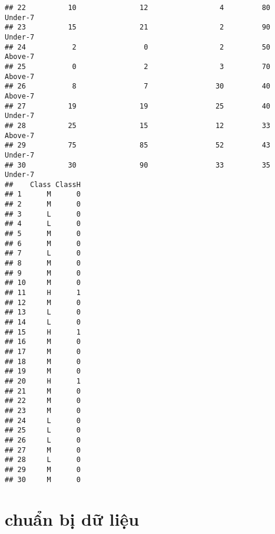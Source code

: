 \documentclass[
]{article}
\newenvironment{Shaded}{\begin{snugshade}}{\end{snugshade}}
\newcommand{\AttributeTok}[1]{\textcolor[rgb]{0.77,0.63,0.00}{#1}}
\newcommand{\CommentTok}[1]{\textcolor[rgb]{0.56,0.35,0.01}{\textit{#1}}}
\newcommand{\ConstantTok}[1]{\textcolor[rgb]{0.00,0.00,0.00}{#1}}
\newcommand{\DecValTok}[1]{\textcolor[rgb]{0.00,0.00,0.81}{#1}}
\newcommand{\FloatTok}[1]{\textcolor[rgb]{0.00,0.00,0.81}{#1}}
\newcommand{\FunctionTok}[1]{\textcolor[rgb]{0.00,0.00,0.00}{#1}}
\newcommand{\NormalTok}[1]{#1}
\newcommand{\OtherTok}[1]{\textcolor[rgb]{0.56,0.35,0.01}{#1}}
\newcommand{\SpecialCharTok}[1]{\textcolor[rgb]{0.00,0.00,0.00}{#1}}
\begin{document}
\begin{verbatim}
## 22          10               12                 4         80            Under-7
## 23          15               21                 2         90            Under-7
## 24           2                0                 2         50            Above-7
## 25           0                2                 3         70            Above-7
## 26           8                7                30         40            Above-7
## 27          19               19                25         40            Under-7
## 28          25               15                12         33            Above-7
## 29          75               85                52         43            Under-7
## 30          30               90                33         35            Under-7
##    Class ClassH
## 1      M      0
## 2      M      0
## 3      L      0
## 4      L      0
## 5      M      0
## 6      M      0
## 7      L      0
## 8      M      0
## 9      M      0
## 10     M      0
## 11     H      1
## 12     M      0
## 13     L      0
## 14     L      0
## 15     H      1
## 16     M      0
## 17     M      0
## 18     M      0
## 19     M      0
## 20     H      1
## 21     M      0
## 22     M      0
## 23     M      0
## 24     L      0
## 25     L      0
## 26     L      0
## 27     M      0
## 28     L      0
## 29     M      0
## 30     M      0
\end{verbatim}

\hypertarget{chuux1ea9n-bux1ecb-dux1eef-liux1ec7u}{%
\section{chuẩn bị dữ liệu}\label{chuux1ea9n-bux1ecb-dux1eef-liux1ec7u}}

\begin{Shaded}
\end{Shaded}
\end{document}

